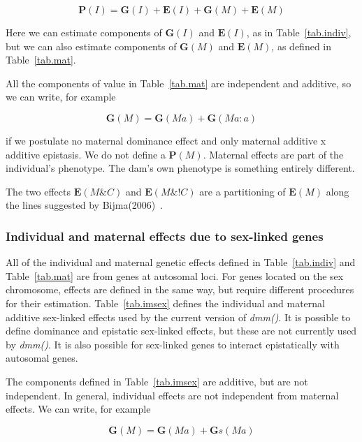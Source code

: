 \documentclass[titlepage]{article}  %
\begin{document}
\begin{equation}
{\bm P(I) = \bm G(I) + \bm E(I) + \bm G(M) + \bm E(M)}    \label{eq.pindmat}
\end{equation}

Here we can estimate components of ${\bm G(I)}$ and ${\bm E(I)}$, as in Table~\ref{tab.indiv}, but we can also estimate components of ${\bm G(M)}$ and ${\bm E(M)}$, as defined in Table~\ref{tab.mat}.



All the components of value in Table~\ref{tab.mat} are independent and additive, so we can write, for example

\begin{displaymath}
{\bm G(M) = \bm G(Ma) + \bm G(Ma:a)}
\end{displaymath}

if we postulate no maternal dominance effect and only maternal additive x additive epistasis. We do not define a ${\bm P(M)}$. Maternal effects are part of the individual's phenotype. The dam's own phenotype is something entirely different.

The two effects ${\bm E(M\&C)}$ and ${\bm E(M\&!C)}$ are a partitioning of ${\bm E(M)}$ along the lines suggested by Bijma(2006)~\cite{bijm:06}.


\subsubsection{Individual and maternal effects due to sex-linked genes}
All of the individual and maternal genetic effects defined in Table~\ref{tab.indiv} and Table~\ref{tab.mat} are from genes at autosomal loci.  For genes located on the sex chromosome, effects are defined in the same way, but require different procedures for their estimation. Table~\ref{tab.imsex} defines the individual and maternal additive sex-linked effects used by the current version of {\em dmm()}. It is possible to define dominance and epistatic sex-linked effects, but these are not currently used by {\em dmm()}. It is also possible for sex-linked genes to interact epistatically with autosomal genes.



The components defined in Table~\ref{tab.imsex} are additive, but are not independent. In general, individual effects are not independent from maternal effects. We can write, for example

\begin{displaymath}
{\bm G(M) = \bm G(Ma) + \bm Gs(Ma)}
\end{displaymath}
\end{document}
